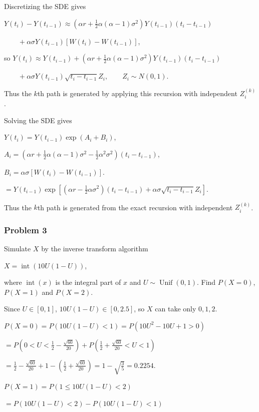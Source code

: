  Discretizing the SDE gives

$Y(t_i)-Y(t_{i-1})\approx\left(\alpha r+\frac12\alpha(\alpha-1)\sigma^2\right)Y(t_{i-1})(t_i-t_{i-1})$

$\qquad+\alpha\sigma Y(t_{i-1})[W(t_i)-W(t_{i-1})]$,

so
$Y(t_i)\approx Y(t_{i-1})+\left(\alpha r+\frac12\alpha(\alpha-1)\sigma^2\right)Y(t_{i-1})(t_i-t_{i-1})$

$\qquad+\alpha\sigma Y(t_{i-1})\sqrt{t_i-t_{i-1}}Z_i,\qquad Z_i\sim N(0,1)$.

Thus the $k$th path is generated by applying this recursion with independent $Z_i^{(k)}$.

 Solving the SDE gives

$Y(t_i)=Y(t_{i-1})\exp(A_i+B_i)$,

$A_i=\left(\alpha r+\frac12\alpha(\alpha-1)\sigma^2-\frac12\alpha^2\sigma^2\right)(t_i-t_{i-1})$,

$B_i=\alpha\sigma[W(t_i)-W(t_{i-1})]$.

$=Y(t_{i-1})\exp\left[\left(\alpha r-\frac12\alpha\sigma^2\right)(t_i-t_{i-1})+\alpha\sigma\sqrt{t_i-t_{i-1}}Z_i\right]$.

Thus the $k$th path is generated from the exact recursion with independent $Z_i^{(k)}$.

\subsubsection*{Problem 3}

 Simulate $X$ by the inverse transform algorithm

$X=\operatorname{int}(10U(1-U))$,

where $\operatorname{int}(x)$ is the integral part of $x$ and $U\sim\operatorname{Unif}(0,1)$. Find $P(X=0)$, $P(X=1)$ and $P(X=2)$.

 Since $U\in[0,1]$, $10U(1-U)\in[0,2.5]$, so $X$ can take only $0,1,2$.

$P(X=0)=P(10U(1-U)<1)=P(10U^2-10U+1>0)$

$=P\left(0<U<\frac12-\frac{\sqrt{60}}{20}\right)+P\left(\frac12+\frac{\sqrt{60}}{20}<U<1\right)$

$=\frac12-\frac{\sqrt{60}}{20}+1-\left(\frac12+\frac{\sqrt{60}}{20}\right)=1-\sqrt{\frac35}=0.2254$.

$P(X=1)=P(1\leq10U(1-U)<2)$

$=P(10U(1-U)<2)-P(10U(1-U)<1)$

